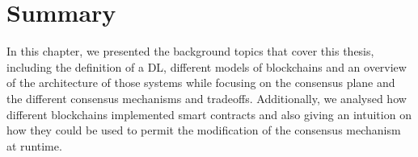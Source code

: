 \section{Summary}
\label{sec:background:summary}

In this chapter, we presented the background topics that cover this thesis, including the definition of a \gls{DL}, different models of blockchains and an overview of the architecture of those systems while focusing on the consensus plane and the different consensus mechanisms and tradeoffs. Additionally, we analysed how different blockchains implemented smart contracts and also giving an intuition on how they could be used to permit the modification of the consensus mechanism at runtime. %



%



